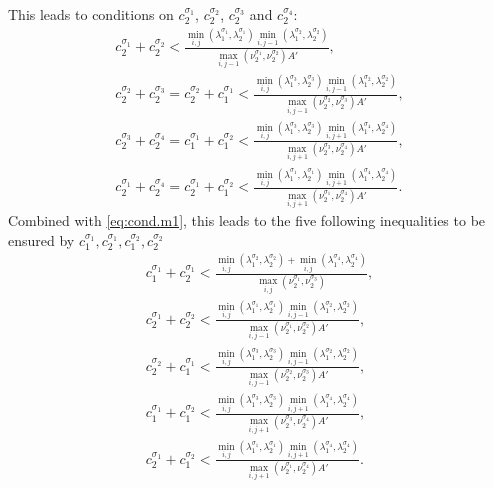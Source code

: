 \documentclass[final,11pt]{elsarticle}
\begin{document}
This leads to conditions on $c_2^{\sigma_1}$, $c_2^{\sigma_2}$, $c_2^{\sigma_3}$ and $c_2^{\sigma_4}$:
\[
\begin{gathered}
    c_2^{\sigma_1}+c_2^{\sigma_2}<\frac{\min_{i,j}(\lambda_1^{\sigma_1},\lambda_2^{\sigma_1})\min_{i, j-1}(\lambda_1^{\sigma_2},\lambda_2^{\sigma_2})}{\max_{i,j-1}(\nu_{2}^{\sigma_1},\nu_{2}^{\sigma_2})A'},\\
    c_2^{\sigma_2}+c_2^{\sigma_3}=c_2^{\sigma_2}+c_1^{\sigma_1}<\frac{\min_{i,j}(\lambda_1^{\sigma_3},\lambda_2^{\sigma_3})\min_{i, j-1}(\lambda_1^{\sigma_2},\lambda_2^{\sigma_2})}{\max_{i,j-1}(\nu_{2}^{\sigma_2},\nu_{2}^{\sigma_3})A'},\\
    c_2^{\sigma_3}+c_2^{\sigma_4}=c_1^{\sigma_1}+c_1^{\sigma_2}<\frac{\min_{i,j}(\lambda_1^{\sigma_3},\lambda_2^{\sigma_3})\min_{i, j+1}(\lambda_1^{\sigma_4},\lambda_2^{\sigma_4})}{\max_{i,j+1}(\nu_{2}^{\sigma_3},\nu_{2}^{\sigma_4})A'},\\
    c_2^{\sigma_1}+c_2^{\sigma_4}=c_2^{\sigma_1}+c_1^{\sigma_2}<\frac{\min_{i,j}(\lambda_1^{\sigma_1},\lambda_2^{\sigma_1})\min_{i, j+1}(\lambda_1^{\sigma_4},\lambda_2^{\sigma_4})}{\max_{i,j+1}(\nu_{2}^{\sigma_1},\nu_{2}^{\sigma_4})A'}.
\end{gathered}
\]
Combined with \eqref{eq:cond.m1}, this leads to the five following inequalities to be ensured by $c_1^{\sigma_1},c_2^{\sigma_1},c_1^{\sigma_2},c_2^{\sigma_2}$
\begin{equation}\label{eq:conditions.ci}
\begin{gathered}
c_1^{\sigma_1}+c_2^{\sigma_1}<\frac{\min_{i,j}(\lambda_1^{\sigma_2},\lambda_2^{\sigma_2})+\min_{i,j}(\lambda_1^{\sigma_4},\lambda_2^{\sigma_4})}{\max_{i,j}(\nu_2^{\sigma_1},\nu_2^{\sigma_3})},\\
c_2^{\sigma_1}+c_2^{\sigma_2}<\frac{\min_{i,j}(\lambda_1^{\sigma_1},\lambda_2^{\sigma_1})\min_{i, j-1}(\lambda_1^{\sigma_2},\lambda_2^{\sigma_2})}{\max_{i,j-1}(\nu_{2}^{\sigma_1},\nu_{2}^{\sigma_2})A'},\\
c_2^{\sigma_2}+c_1^{\sigma_1}<\frac{\min_{i,j}(\lambda_1^{\sigma_3},\lambda_2^{\sigma_3})\min_{i, j-1}(\lambda_1^{\sigma_2},\lambda_2^{\sigma_2})}{\max_{i,j-1}(\nu_{2}^{\sigma_2},\nu_{2}^{\sigma_3})A'},\\
c_1^{\sigma_1}+c_1^{\sigma_2}<\frac{\min_{i,j}(\lambda_1^{\sigma_3},\lambda_2^{\sigma_3})\min_{i, j+1}(\lambda_1^{\sigma_4},\lambda_2^{\sigma_4})}{\max_{i,j+1}(\nu_{2}^{\sigma_3},\nu_{2}^{\sigma_4})A'},\\
c_2^{\sigma_1}+c_1^{\sigma_2}<\frac{\min_{i,j}(\lambda_1^{\sigma_1},\lambda_2^{\sigma_1})\min_{i, j+1}(\lambda_1^{\sigma_4},\lambda_2^{\sigma_4})}{\max_{i,j+1}(\nu_{2}^{\sigma_1},\nu_{2}^{\sigma_4})A'}.
\end{gathered}
\end{equation}



\end{document}
